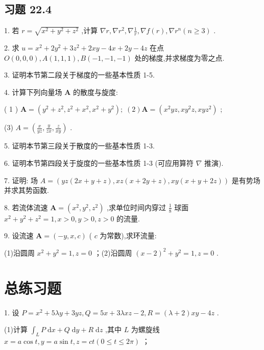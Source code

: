 \subsection{习题 22.4}

1. 若 \(r = \sqrt{{x}^{2} + {y}^{2} + {z}^{2}}\) ,计算 \(\nabla r,\nabla {r}^{2},\nabla \frac{1}{r},\nabla f\left( r\right) ,\nabla {r}^{n}\left( {n \geq  3}\right)\) .

2. 求 \(u = {x}^{2} + 2{y}^{2} + 3{z}^{2} + {2xy} - {4x} + {2y} - {4z}\) 在点 \(O\left( {0,0,0}\right) ,A\left( {1,1,1}\right) ,B\left( {-1, - 1, - 1}\right)\) 处的梯度,并求梯度为零之点.

3. 证明本节第二段关于梯度的一些基本性质 1-5.

4. 计算下列向量场 \(\mathbf{A}\) 的散度与旋度:

( 1 ) \(\mathbf{A} = \left( {{y}^{2} + {z}^{2},{z}^{2} + {x}^{2},{x}^{2} + {y}^{2}}\right) ;\;\left( 2\right) \mathbf{A} = \left( {{x}^{2}{yz},x{y}^{2}z,{xy}{z}^{2}}\right)\) ;

(3) \(A = \left( {\frac{x}{yz},\frac{y}{zx},\frac{z}{xy}}\right)\) .

5. 证明本节第三段关于散度的一些基本性质 1-3.

6. 证明本节第四段关于旋度的一些基本性质 1-3 (可应用算符 \(\nabla\) 推演).

7. 证明: 场 \(A = \left( {{yz}\left( {{2x} + y + z}\right) ,{xz}\left( {x + {2y} + z}\right) ,{xy}\left( {x + y + {2z}}\right) }\right)\) 是有势场并求其势函数.

8. 若流体流速 \(\mathbf{A} = \left( {{x}^{2},{y}^{2},{z}^{2}}\right)\) ,求单位时间内穿过 \(\frac{1}{8}\) 球面 \({x}^{2} + {y}^{2} + {z}^{2} = 1,x > 0,y > 0,z > 0\) 的流量.

9. 设流速 \(\mathbf{A} = \left( {-y,x,c}\right)\) ( \(c\) 为常数),求环流量:

(1)沿圆周 \({x}^{2} + {y}^{2} = 1,z = 0\) ；(2)沿圆周 \({\left( x - 2\right) }^{2} + {y}^{2} = 1,z = 0\) .

\section{总练习题}

1. 设 \(P = {x}^{2} + {5\lambda y} + {3yz},Q = {5x} + {3\lambda xz} - 2,R = \left( {\lambda  + 2}\right) {xy} - {4z}\) .

(1)计算 \({\int }_{L}P\mathrm{\;d}x + Q\mathrm{\;d}y + R\mathrm{\;d}z\) ,其中 \(L\) 为螺旋线 \(x = a\cos t,y = a\sin t,z = {ct}\left( {0 \leq  t \leq  {2\pi }}\right)\) ；

